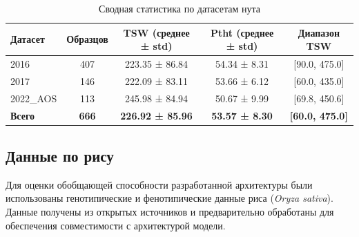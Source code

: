 
\begin{table}
	\centering
	\small
	\caption{Сводная статистика по датасетам нута}
	\label{tab:chickpea_stats}
	\begin{tabular}{|l|c|c|c|c|}
		\hline
		\textbf{Датасет} & \textbf{Образцов} & \textbf{TSW (среднее ± std)} & \textbf{Ptht (среднее ± std)} & \textbf{Диапазон TSW} \\ \hline
		2016    & 407 & 223.35 ± 86.84 & 54.34 ± 8.31 & [90.0, 475.0] \\ \hline
		2017    & 146 & 222.09 ± 83.11 & 53.66 ± 6.12 & [60.0, 435.0] \\ \hline
		2022\_AOS & 113 & 245.98 ± 84.94 & 50.67 ± 9.99 & [69.8, 450.6] \\ \hline
		\textbf{Всего} & \textbf{666} & \textbf{226.92 ± 85.96} & \textbf{53.57 ± 8.30} & \textbf{[60.0, 475.0]} \\ \hline
	\end{tabular}
	\normalsize
\end{table}

\subsection{Данные по рису}

Для оценки обобщающей способности разработанной архитектуры были использованы генотипические и фенотипические данные риса (\textit{Oryza sativa}). Данные получены из открытых источников \cite{Lu2015} и предварительно обработаны для обеспечения совместимости с архитектурой модели.


